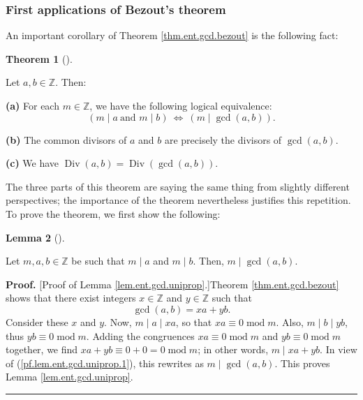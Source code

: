\documentclass[numbers=enddot,12pt,final,onecolumn,notitlepage]{scrartcl}%
\numberwithin{exer}{subsection}
\theoremstyle{definition}
\newtheorem{theo}{Theorem}[subsection]
\newenvironment{theorem}[1][]
{\begin{theo}[#1]\begin{leftbar}}
{\end{leftbar}\end{theo}}
\newtheorem{lem}[theo]{Lemma}
\newenvironment{lemma}[1][]
{\begin{lem}[#1]\begin{leftbar}}
{\end{leftbar}\end{lem}}
\newenvironment{proof}[1][Proof]{\noindent\textbf{#1.} }{\ \rule{0.5em}{0.5em}}
\begin{document}
\subsubsection{First applications of Bezout's theorem}

An important corollary of Theorem \ref{thm.ent.gcd.bezout} is the following fact:

\begin{theorem}
\label{thm.ent.gcd.uniprop}Let $a,b\in\mathbb{Z}$. Then:

\textbf{(a)} For each $m\in\mathbb{Z}$, we have the following logical
equivalence:%
\begin{equation}
\left(  m\mid a\ \text{and }m\mid b\right)  \ \Longleftrightarrow\ \left(
m\mid\gcd\left(  a,b\right)  \right)  . \label{eq.thm.ent.gcd.uniprop.equiv}%
\end{equation}


\textbf{(b)} The common divisors of $a$ and $b$ are precisely the divisors of
$\gcd\left(  a,b\right)  $.

\textbf{(c)} We have $\operatorname*{Div}\left(  a,b\right)
=\operatorname*{Div}\left(  \gcd\left(  a,b\right)  \right)  $.
\end{theorem}

The three parts of this theorem are saying the same thing from slightly
different perspectives; the importance of the theorem nevertheless justifies
this repetition. To prove the theorem, we first show the following:

\begin{lemma}
\label{lem.ent.gcd.uniprop}Let $m,a,b\in\mathbb{Z}$ be such that $m\mid a$ and
$m\mid b$. Then, $m\mid\gcd\left(  a,b\right)  $.
\end{lemma}

\begin{proof}
[Proof of Lemma \ref{lem.ent.gcd.uniprop}.]Theorem \ref{thm.ent.gcd.bezout}
shows that there exist integers $x\in\mathbb{Z}$ and $y\in\mathbb{Z}$ such
that%
\begin{equation}
\gcd\left(  a,b\right)  =xa+yb. \label{pf.lem.ent.gcd.uniprop.1}%
\end{equation}
Consider these $x$ and $y$. Now, $m\mid a\mid xa$, so that $xa\equiv
0\operatorname{mod}m$. Also, $m\mid b\mid yb$, thus $yb\equiv
0\operatorname{mod}m$. Adding the congruences $xa\equiv0\operatorname{mod}m$
and $yb\equiv0\operatorname{mod}m$ together, we find $xa+yb\equiv
0+0=0\operatorname{mod}m$; in other words, $m\mid xa+yb$. In view of
(\ref{pf.lem.ent.gcd.uniprop.1}), this rewrites as $m\mid\gcd\left(
a,b\right)  $. This proves Lemma \ref{lem.ent.gcd.uniprop}.
\end{proof}
\end{document}

